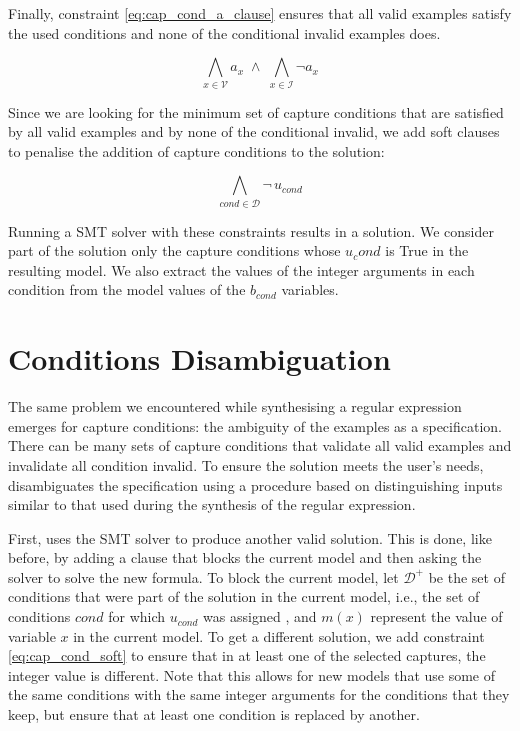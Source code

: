 Finally, constraint \ref{eq:cap_cond_a_clause} ensures that all valid examples satisfy the used conditions and none of the conditional invalid examples does.

\begin{equation}\label{eq:cap_cond_a_clause}
    \bigwedge_{x \in \mathcal{V}} a_x \;\land\; \bigwedge_{x \in \mathcal{I}} \neg a_x
\end{equation}


Since we are looking for the minimum set of capture conditions that are satisfied by all valid examples and by none of the conditional invalid, we add soft clauses to penalise the addition of capture conditions to the solution:

\begin{equation}
    \bigwedge_{cond \in \mathcal{D}} \neg\, u_{cond}
\end{equation}

Running a \ac{SMT} solver with these constraints results in a solution. We consider part of the solution only the capture conditions whose \(u_cond\) is True in the resulting model. We also extract the values of the integer arguments in each condition from the model values of the \(b_{\textit{cond}}\) variables.

\section{Conditions Disambiguation}
\label{sec:cap_cond_distinguish}

The same problem we encountered while synthesising a regular expression emerges for capture conditions: the ambiguity of the examples as a specification. There can be many sets of capture conditions that validate all valid examples and invalidate all condition invalid. To ensure the solution meets the user's needs, \Forest disambiguates the specification using a procedure based on distinguishing inputs similar to that used during the synthesis of the regular expression.

First, \Forest uses the \ac{SMT} solver to produce another valid solution. This is done, like before, by adding a clause that blocks the current model and then asking the solver to solve the new formula.
%
To block the current model, let \(\mathcal{D^+}\) be the set of conditions that were part of the solution in the current model, i.e., the set of conditions \(\textit{cond}\) for which \(u_{\textit{cond}}\) was assigned \true, and \(m(x)\) represent the value of variable \(x\) in the current model.
To get a different solution, we add constraint \ref{eq:cap_cond_soft} to ensure that in at least one of the selected captures, the integer value is different. Note that this allows for new models that use some of the same conditions with the same integer arguments for the conditions that they keep, but ensure that at least one condition is replaced by another.

